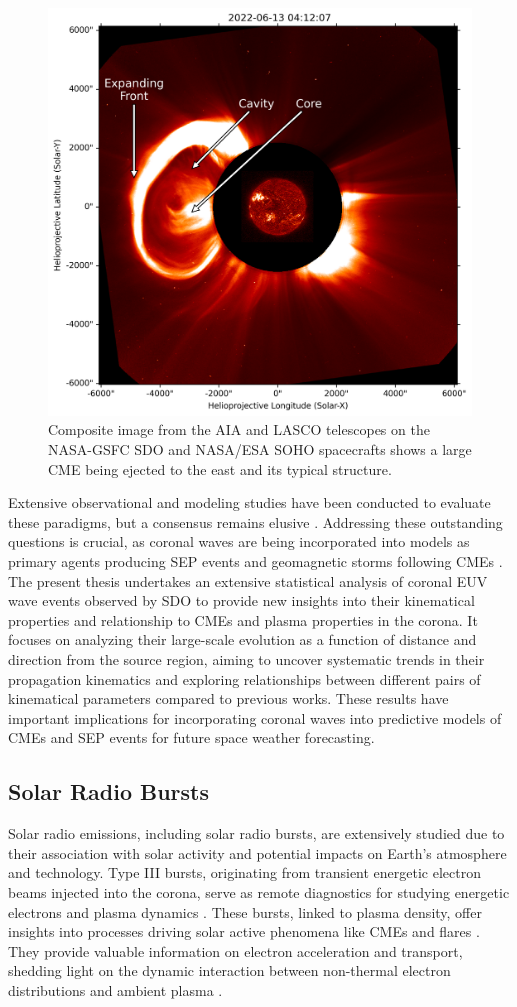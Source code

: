 \begin{figure}[!htp]
	\centerline{\includegraphics[width=0.6\columnwidth]{chapter1/figs/AIA_LASCO_composite_2022613.png}}
	\caption{Composite image from the AIA and LASCO telescopes on the NASA-GSFC SDO and NASA/ESA SOHO spacecrafts shows a large CME being ejected to the east and its typical structure.}
	\label{fig_cme}
\end{figure}

Extensive observational and modeling studies have been conducted to evaluate these paradigms, but a consensus remains elusive \citep{patsourakos_2012, long_2017}. Addressing these outstanding questions is crucial, as coronal waves are being incorporated into models as primary agents producing SEP events and geomagnetic storms following CMEs \citep{rouillard_2012, park_2013}. The present thesis undertakes an extensive statistical analysis of coronal EUV wave events observed by SDO to provide new insights into their kinematical properties and relationship to CMEs and plasma properties in the corona. It focuses on analyzing their large-scale evolution as a function of distance and direction from the source region, aiming to uncover systematic trends in their propagation kinematics and exploring relationships between different pairs of kinematical parameters compared to previous works. These results have important implications for incorporating coronal waves into predictive models of CMEs and SEP events for future space weather forecasting.

\subsection{Solar Radio Bursts}
Solar radio emissions, including solar radio bursts, are extensively studied due to their association with solar activity and potential impacts on Earth's atmosphere and technology. Type III bursts, originating from transient energetic electron beams injected into the corona, serve as remote diagnostics for studying energetic electrons and plasma dynamics \citep{ergun_1998, pick_2006, reid_2020}. These bursts, linked to plasma density, offer insights into processes driving solar active phenomena like CMEs and flares \citep{reid_2014, kontar_2017}. They provide valuable information on electron acceleration and transport, shedding light on the dynamic interaction between non-thermal electron distributions and ambient plasma \citep{melrose_1980}.

